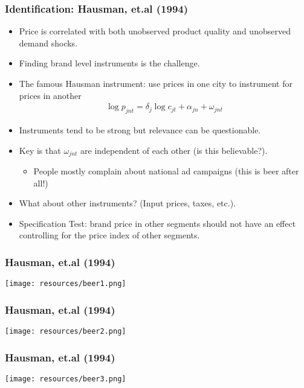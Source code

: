 \documentclass[xcolor=pdftex,dvipsnames,table,mathserif,aspectratio=169]{beamer}
\begin{document}
\begin{frame}
\frametitle{Identification: Hausman, et.al (1994)}
\small
\begin{itemize}
\item Price is correlated with both \alert{unobserved product quality} and \alert{unobserved demand shocks}.
\item Finding brand level instruments is the challenge.
\item The famous \alert{Hausman instrument}: use prices in one city to instrument for prices in another
\begin{eqnarray*}
\log p_{jnt} = \delta_j \log c_{jt} + \alpha_{jn} + \omega_{jnt}
\end{eqnarray*}
\item Instruments tend to be \alert{strong} but \alert{relevance} can be questionable.
\item Key is that $\omega_{jnt}$ are independent of each other (is this believable?).
\begin{itemize}
\item People mostly complain about national ad campaigns (this is beer after all!)
\end{itemize}
\item What about other instruments? (Input prices, taxes, etc.).
\item Specification Test: brand price in other segments should not have an effect controlling for the price index of other segments.
\end{itemize}
\end{frame} 


\begin{frame}
\frametitle{Hausman, et.al (1994)}
\begin{center}
\texttt{[image: resources/beer1.png]}
\end{center}
\end{frame} 

\begin{frame}
\frametitle{Hausman, et.al (1994)}
\begin{center}
\texttt{[image: resources/beer2.png]}
\end{center}
\end{frame} 

\begin{frame}
\frametitle{Hausman, et.al (1994)}
\begin{center}
\texttt{[image: resources/beer3.png]}
\end{center}
\end{frame} 
\end{document}
